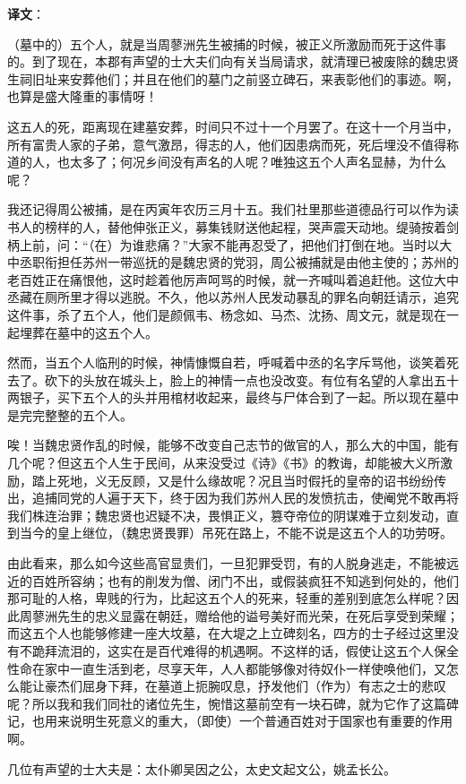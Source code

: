\documentclass[12pt,UTF-8,openany,a4]{ctexbook}
\begin{document}
\newpage

\begin{Large}
   \noindent \textbf{译文}：
\end{Large}

\vspace{1em}

\begin{large}\yiwen
    
    （墓中的）五个人，就是当周蓼洲先生被捕的时候，被正义所激励而死于这件事的。到了现在，本郡有声望的士大夫们向有关当局请求，就清理已被废除的魏忠贤生祠旧址来安葬他们；并且在他们的墓门之前竖立碑石，来表彰他们的事迹。啊，也算是盛大隆重的事情呀！
    
    这五人的死，距离现在建墓安葬，时间只不过十一个月罢了。在这十一个月当中，所有富贵人家的子弟，意气激昂，得志的人，他们因患病而死，死后埋没不值得称道的人，也太多了；何况乡间没有声名的人呢？唯独这五个人声名显赫，为什么呢？
    
    我还记得周公被捕，是在丙寅年农历三月十五。我们社里那些道德品行可以作为读书人的榜样的人，替他伸张正义，募集钱财送他起程，哭声震天动地。缇骑按着剑柄上前，问：“（在）为谁悲痛？”大家不能再忍受了，把他们打倒在地。当时以大中丞职衔担任苏州一带巡抚的是魏忠贤的党羽，周公被捕就是由他主使的；苏州的老百姓正在痛恨他，这时趁着他厉声呵骂的时候，就一齐喊叫着追赶他。这位大中丞藏在厕所里才得以逃脱。不久，他以苏州人民发动暴乱的罪名向朝廷请示，追究这件事，杀了五个人，他们是颜佩韦、杨念如、马杰、沈扬、周文元，就是现在一起埋葬在墓中的这五个人。
    
    然而，当五个人临刑的时候，神情慷慨自若，呼喊着中丞的名字斥骂他，谈笑着死去了。砍下的头放在城头上，脸上的神情一点也没改变。有位有名望的人拿出五十两银子，买下五个人的头并用棺材收起来，最终与尸体合到了一起。所以现在墓中是完完整整的五个人。
    
    唉！当魏忠贤作乱的时候，能够不改变自己志节的做官的人，那么大的中国，能有几个呢？但这五个人生于民间，从来没受过《诗》《书》的教诲，却能被大义所激励，踏上死地，义无反顾，又是什么缘故呢？况且当时假托的皇帝的诏书纷纷传出，追捕同党的人遍于天下，终于因为我们苏州人民的发愤抗击，使阉党不敢再将我们株连治罪；魏忠贤也迟疑不决，畏惧正义，篡夺帝位的阴谋难于立刻发动，直到当今的皇上继位，（魏忠贤畏罪）吊死在路上，不能不说是这五个人的功劳呀。
    
    由此看来，那么如今这些高官显贵们，一旦犯罪受罚，有的人脱身逃走，不能被远近的百姓所容纳；也有的削发为僧、闭门不出，或假装疯狂不知逃到何处的，他们那可耻的人格，卑贱的行为，比起这五个人的死来，轻重的差别到底怎么样呢？因此周蓼洲先生的忠义显露在朝廷，赠给他的谥号美好而光荣，在死后享受到荣耀；而这五个人也能够修建一座大坟墓，在大堤之上立碑刻名，四方的士子经过这里没有不跪拜流泪的，这实在是百代难得的机遇啊。不这样的话，假使让这五个人保全性命在家中一直生活到老，尽享天年，人人都能够像对待奴仆一样使唤他们，又怎么能让豪杰们屈身下拜，在墓道上扼腕叹息，抒发他们（作为）有志之士的悲叹呢？所以我和我们同社的诸位先生，惋惜这墓前空有一块石碑，就为它作了这篇碑记，也用来说明生死意义的重大，（即使）一个普通百姓对于国家也有重要的作用啊。
    
    几位有声望的士大夫是：太仆卿吴因之公，太史文起文公，姚孟长公。
    

\end{large}
\end{document}
